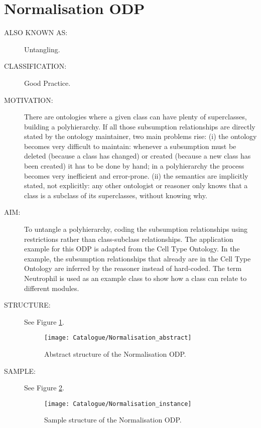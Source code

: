  \section{Normalisation ODP}\begin{description}
\item [ALSO KNOWN AS:] Untangling.

\item [CLASSIFICATION:] Good Practice.

\item [MOTIVATION:] There are ontologies where a given class can have plenty of superclasses, building a polyhierarchy. If all those subsumption relationships are directly stated by the ontology maintainer, two main problems rise: (i) the ontology becomes very difficult to maintain: whenever a subsumption must be deleted (because a class has changed) or created (because a new class has been created) it has to be done by hand; in a polyhierarchy the process becomes very inefficient and error-prone. (ii) the semantics are implicitly stated, not explicitly: any other ontologist or reasoner only knows that a class is a subclass of its superclasses, without knowing why.

\item [AIM:] To untangle a polyhierarchy, coding the subsumption relationships using restrictions rather than class-subclass relationships. The application example for this ODP is adapted from the Cell Type Ontology. In the example, the subsumption relationships that already are in the Cell Type Ontology are inferred by the reasoner instead of hard-coded. The term Neutrophil is used as an example class to show how a class can relate to different modules.

\item [STRUCTURE:] See Figure \ref{odp:Normalisation_abstract}.
\begin{figure}[]\centering\texttt{[image: Catalogue/Normalisation\_abstract]}\caption{\label{odp:Normalisation_abstract} Abstract structure of the Normalisation ODP.}\end{figure}

\item [SAMPLE:] See Figure \ref{odp:Normalisation_instance}.
\begin{figure}[]\centering\texttt{[image: Catalogue/Normalisation\_instance]}\caption{\label{odp:Normalisation_instance} Sample structure of the Normalisation ODP.}\end{figure}


\end{description}
